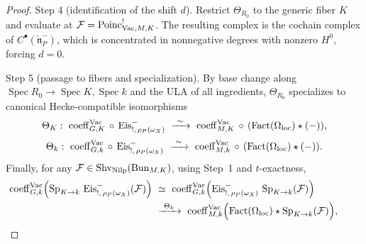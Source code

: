 \begin{proof}
Step 4 (identification of the shift $d$). Restrict $\Theta_{R_0}$ to the generic fiber $K$ and evaluate at $\mathcal F=\mathrm{Poinc}^{!}_{\mathrm{Vac},M,K}$. The resulting complex is the cochain complex of $C^\bullet(\check{\mathfrak n}^-_P)$, which is concentrated in nonnegative degrees with nonzero $H^0$, forcing $d=0$.

Step 5 (passage to fibers and specialization). By base change along $\operatorname{Spec} R_0\to\operatorname{Spec} K,\operatorname{Spec} k$ and the ULA of all ingredients, $\Theta_{R_0}$ specializes to canonical Hecke-compatible isomorphisms
\[
\Theta_K:\ \coeff^{\Vac}_{G,K}\ccomp \mathrm{Eis}^-_{!,\,\rho_P(\omega_X)}\ \xrightarrow{\ \sim\ }\ \coeff^{\Vac}_{M,K}\ccomp(\mathrm{Fact}(\Omega_{\mathrm{loc}})\star(-)),
\]
\[
\Theta_k:\ \coeff^{\Vac}_{G,k}\ccomp \mathrm{Eis}^-_{!,\,\rho_P(\omega_X)}\ \xrightarrow{\ \sim\ }\ \coeff^{\Vac}_{M,k}\ccomp(\mathrm{Fact}(\Omega_{\mathrm{loc}})\star(-)).
\]
Finally, for any $\mathcal F\in \mathrm{Shv}_{\mathrm{Nilp}}(\mathrm{Bun}_{M,K})$, using Step~1 and $t$-exactness,
\begin{align*}
\coeff^{\Vac}_{G,k}\Bigl(\Sp_{K\to k}\,\mathrm{Eis}^-_{!,\,\rho_P(\omega_X)}(\mathcal F)\Bigr)
&\ \simeq\ \coeff^{\Vac}_{G,k}\Bigl(\mathrm{Eis}^-_{!,\,\rho_P(\omega_X)}\,\Sp_{K\to k}(\mathcal F)\Bigr)\\
&\ \xrightarrow{\ \Theta_k\ }\ \coeff^{\Vac}_{M,k}\Bigl(\mathrm{Fact}(\Omega_{\mathrm{loc}})\star \Sp_{K\to k}(\mathcal F)\Bigr),\qquad\qedhere
\end{align*}
\end{proof}
